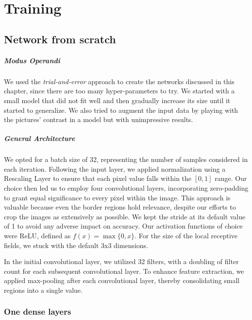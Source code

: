 \chapter{Training}


\section{Network from scratch}

\paragraph{Modus Operandi}
We used the \emph{trial-and-error} approach to create the networks discussed in this chapter, since there are too many hyper-parameters to try.  We started with a small model that did not fit well and then gradually increase
its size until it started to generalize. We also tried to augment the input data by playing with the pictures' contrast in a model but with unimpressive results.

\paragraph{General Architecture}
We opted for a batch size of 32, representing the number of samples considered in each iteration. Following the input layer, we applied normalization using a Rescaling Layer to ensure that each pixel value falls within the $[0,1]$ range. Our choice then led us to employ four convolutional layers, incorporating zero-padding to grant equal significance to every pixel within the image. This approach is valuable because even the border regions hold relevance, despite our efforts to crop the images as extensively as possible. We kept the stride at its default value of 1 to avoid any adverse impact on accuracy. Our activation functions of choice were ReLU, defined as $f(x) = \max\{0, x\}$. For the size of the local receptive fields, we stuck with the default 3x3 dimensions.

In the initial convolutional layer, we utilized 32 filters, with a doubling of filter count for each subsequent convolutional layer. To enhance feature extraction, we applied max-pooling after each convolutional layer, thereby consolidating small regions into a single value.

\subsection{One dense layers}
\label{scratch.1dense}

